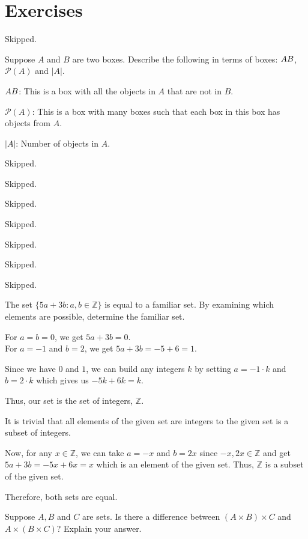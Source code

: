 \section*{Exercises}


\begin{problem}Skipped.\end{problem}

\begin{problem}
	Suppose $A$ and $B$ are two boxes. Describe the following in terms of boxes: $A \\ B$, $\mathcal{P}(A)$ and $|A|$.
\end{problem}
\begin{solution}
	$A \\ B$: This is a box with all the objects in $A$ that are not in $B$.

	$\mathcal{P}(A)$: This is a box with many boxes such that each box in this box has objects from $A$.

	$|A|$: Number of objects in $A$.
\end{solution}


\begin{problem}Skipped.\end{problem}
\begin{problem}Skipped.\end{problem}
\begin{problem}Skipped.\end{problem}
\begin{problem}Skipped.\end{problem}
\begin{problem}Skipped.\end{problem}
\begin{problem}Skipped.\end{problem}
\begin{problem}Skipped.\end{problem}

\begin{problem}
	The set $\{5a+3b: a, b \in \mathbb{Z}\}$ is equal to a familiar set. By examining which elements are possible, determine the familiar set.
\end{problem}

\begin{solution}
	For $a = b = 0$, we get $5a + 3b = 0$. \\
	For $a = -1$ and $b = 2$, we get $5a + 3b = -5+6 = 1$.

	Since we have $0$ and $1$, we can build any integers $k$ by setting $a = -1 \cdot k$ and $b = 2 \cdot k$ which gives us $-5k+6k = k$.

	Thus, our set is the set of integers, $\mathbb{Z}$.

	It is trivial that all elements of the given set are integers to the given set is a subset of integers.

	Now, for any $x \in \mathbb{Z}$, we can take $a = -x$ and $b = 2x$ since $-x, 2x \in \mathbb{Z}$ and get $5a + 3b = -5x + 6x = x$ which is an element of the given set.
	Thus, $\mathbb{Z}$ is a subset of the given set.

	Therefore, both sets are equal.

\end{solution}

\begin{problem}
	Suppose $A, B$ and $C$ are sets. Is there a difference between $(A \times B) \times C$ and $A \times (B \times C)$? Explain your answer.
\end{problem}

